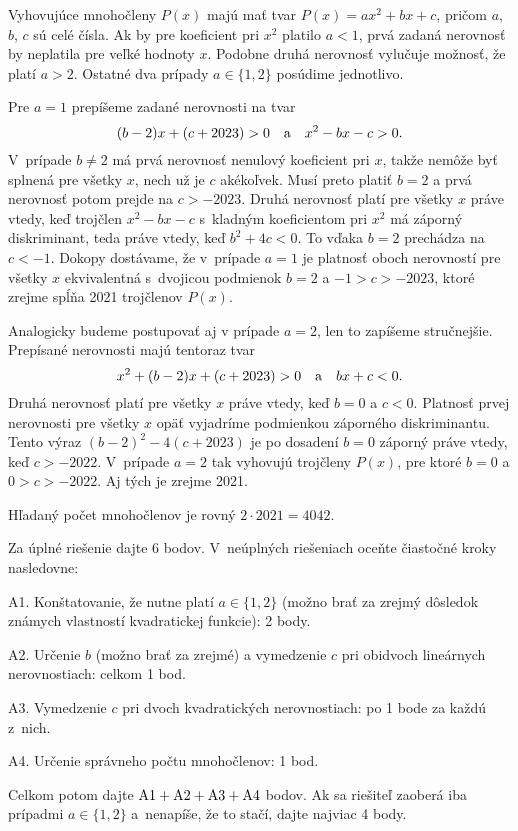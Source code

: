 {%
Vyhovujúce mnohočleny $P(x)$ majú mať tvar
$P(x) = ax^2+bx+c$, pričom $a$, $b$, $c$ sú celé čísla.
Ak by pre koeficient pri $x^2$ platilo $a<1$,
prvá zadaná nerovnosť by neplatila pre veľké hodnoty $x$.
Podobne druhá nerovnosť vylučuje
možnosť, že platí $a>2$. Ostatné dva prípady
$a\in\{1,2\}$ posúdime jednotlivo.

Pre $a=1$ prepíšeme zadané nerovnosti na tvar
$$
(b-2)x + (c+2023) > 0\quad\hbox{a}\quad x^2 -bx - c > 0.
$$
V~prípade $b\ne2$ má prvá nerovnosť nenulový koeficient
pri $x$, takže nemôže byť splnená pre všetky $x$, nech už je $c$ akékoľvek.
Musí preto
platiť $b=2$ a prvá nerovnosť potom prejde na $c>-2023$.
Druhá nerovnosť platí pre všetky $x$ práve vtedy, keď
trojčlen $x^2 - bx - c$ s~kladným koeficientom pri $x^2$
má záporný diskriminant, teda práve vtedy, keď $b^2 + 4c<0$.
To vďaka $b=2$ prechádza na $c<-1$. Dokopy
dostávame, že v~prípade $a=1$ je platnosť oboch nerovností pre
všetky $x$ ekvivalentná s~dvojicou podmienok $b=2$ a $-1>c>-2023$,
ktoré zrejme spĺňa 2021 trojčlenov $P(x)$.

Analogicky budeme postupovať aj v prípade $a=2$, len to zapíšeme
stručnejšie. Prepísané nerovnosti majú tentoraz tvar
$$
x^2+(b-2)x + (c+2023) > 0\quad\hbox{a}\quad bx + c < 0.
$$
Druhá nerovnosť platí pre všetky $x$ práve vtedy, keď $b=0$ a $c<0$.
Platnosť prvej nerovnosti pre všetky $x$
opäť vyjadríme podmienkou záporného diskriminantu.
Tento výraz $(b-2)^2-4(c+2023)$ je po dosadení $b=0$ záporný
práve vtedy, keď $c > -2022$. V~prípade $a=2$ tak vyhovujú trojčleny
$P(x)$, pre ktoré $b=0$ a $0>c> -2022$. Aj tých je zrejme 2021.

\zaver
Hľadaný počet mnohočlenov je rovný $2\cdot2021=4042$.

\schemaABC
Za úplné riešenie dajte 6 bodov. V~neúplných riešeniach oceňte
čiastočné kroky nasledovne:
\item{A1.} Konštatovanie, že nutne platí $a\in\{1,2\}$ (možno brať za zrejmý dôsledok známych vlastností kvadratickej funkcie): 2 body.
\item{A2.} Určenie $b$ (možno brať za zrejmé) a vymedzenie $c$ pri obidvoch lineárnych nerovnostiach: celkom 1 bod.
\item{A3.} Vymedzenie $c$ pri dvoch kvadratických nerovnostiach: po 1 bode za každú z~nich.
\item{A4.} Určenie správneho počtu mnohočlenov: 1 bod.

Celkom potom dajte $\rm A1+A2+A3+A4$ bodov. Ak sa riešiteľ
zaoberá iba prípadmi $a\in\{1,2\}$ a~nenapíše, že to stačí,
dajte najviac 4 body.
\endschema
}

